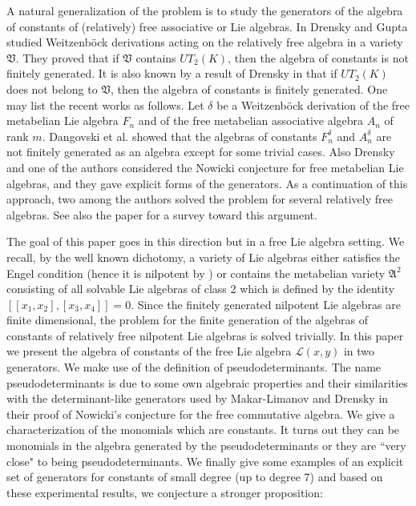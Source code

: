 \documentclass{cimart}
\begin{document}
A natural generalization of the problem is to study the generators of the algebra of constants of (relatively) free associative or Lie algebras.
In \cite{DG} Drensky and Gupta studied Weitzenb\"ock derivations acting on the relatively free algebra in a variety $\mathfrak{V}$. They proved that
if  $\mathfrak{V}$ contains $UT_2(K)$, then the algebra of constants is not finitely generated. 
It is also known by a result of Drensky in \cite{D1} that 
if $UT_2(K)$ does not belong to $\mathfrak{V}$, then  the algebra of constants is finitely generated.
One may list the recent works as follows. Let $\delta$ be a Weitzenb\"ock derivation of the free metabelian Lie algebra $F_n$
and of the free metabelian associative algebra $A_n$ of rank $m$.
Dangovski et al. \cite{DDF,DDF1} showed that 
the algebras of constants $F_{n}^{\delta}$ and $A_{n}^{\delta}$ are not finitely generated as an algebra
except for some trivial cases. 
Also Drensky and one of the authors \cite{DF1}
considered the Nowicki conjecture for free metabelian Lie algebras, and they gave explicit forms of the generators.
As a continuation of this approach, two among the authors \cite{CF}
solved the problem for several relatively free algebras. See also the paper \cite{cedufi} for a survey toward this argument.

The goal of this paper goes in this direction but in a free Lie algebra setting. We recall, by the well known dichotomy, a variety of Lie algebras either satisfies the
Engel condition (hence it is nilpotent by \cite{zel1}) or contains the metabelian variety $\mathfrak{A}^2$ consisting of all solvable Lie algebras of class 2 which is defined by the identity $[[x_1, x_2], [x_3, x_4]] = 0$. Since the finitely generated nilpotent Lie algebras are finite dimensional, the problem for the finite generation of the algebras of constants of relatively free nilpotent Lie algebras is solved trivially. In this paper we present the algebra of constants of the free Lie algebra $\mathcal{L}(x,y)$ in two generators. We make use of the definition of pseudodeterminants. The name pseudodeterminants is due to some own algebraic properties and their similarities with the determinant-like generators used by Makar-Limanov and Drensky in their proof of Nowicki's conjecture for the free commutative algebra. We give a characterization of the monomials which are constants. It turns out they can be monomials in the algebra generated by the pseudodeterminants or they are “very close" to being pseudodeterminants. We finally give some examples of an explicit set of generators for constants of small degree (up to degree 7) and based on these experimental results, we conjecture a stronger proposition:
\end{document}
